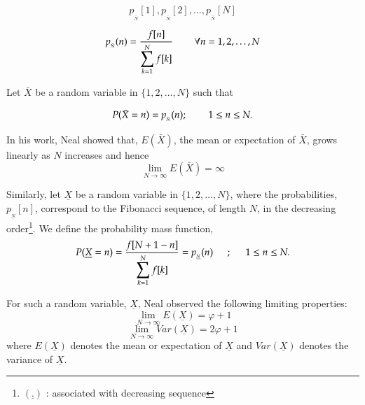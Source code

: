 \begin{multicols}{2}
\vspace{-.6cm}

$$
p_{_{\bar{N}}}[1], p_{_{\bar{N}}}[2], \ldots, p_{_{\bar{N}}}[N]
$$

\vspace{-.2cm}

\begin{equation}
 p_{_{\bar{N}}}(n) = \frac{f[n]}{\displaystyle{\sum_{k =1}^N f[k]}} \hspace{0.3in} \forall n = 1, 2, \ldots, N \label{eq-2.3}
 \end{equation}

\vspace{-.2cm}

Let $\bar{X}$ be a random variable in $\{1,2, \ldots, N\}$ such that  

\vspace{-.2cm} 
 
\begin{equation}
P(\bar{X} = n) = p_{_{\bar{N}}}(n); \hspace{0.3in} 1 \leq n\leq N.\label{eq-2.4}
\end{equation}
 
\vspace{-.2cm} 
 
In his work, Neal \cite{art1-key01} showed that, $E(\bar{X})$, the mean or expectation of $\bar{X}$, grows linearly as $N$ increases and hence 
\begin{equation}
\lim_{N\rightarrow \infty} E(\bar{X}) = \infty\label{eq-2.5}
\end{equation} 

\vspace{-.4cm} 

Similarly, let $\underline{X}$ be a random variable in $\{1,2, \ldots, N\}$, where the probabilities, $p_{_{\underline{N}}}[n]$, correspond to the Fibonacci sequence, of length $N$, in the decreasing order\footnote{${(\underline{.})}$ : associated with decreasing sequence}. We define the probability mass function,
\begin{equation}
P(\underline{X} = n) = \frac{f[N+1-n]}{\displaystyle{\sum_{k =1}^N f[k]}} = p_{_{\underline{N}}}(n) \hspace{0.2in} ; \hspace{0.2in} 1 \leq n\leq N.\label{eq-2.6}
 \end{equation}

For such a random variable, $\underline{X}$, Neal \cite{neal} observed the following limiting properties:
\begin{equation}
\lim_{N\rightarrow \infty} E(\underline{X}) = \varphi + 1\label{eq-2.7}
\end{equation}
\begin{equation}
\lim_{N\rightarrow \infty} Var(\underline{X}) = 2\varphi + 1\label{eq-2.8}
\end{equation}
where $E(\underline{X})$ denotes the mean or expectation of $\underline{X}$ and $Var(\underline{X})$ denotes the variance of $\underline{X}$.


\end{multicols}
